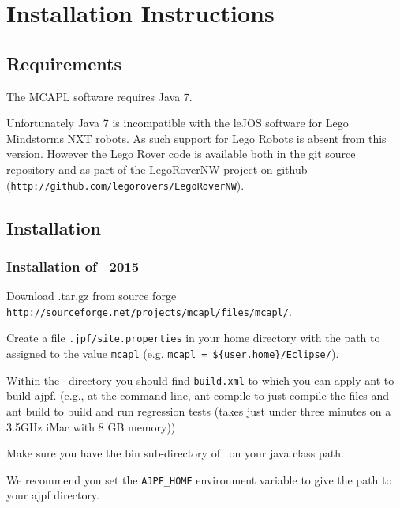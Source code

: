 \chapter{Installation Instructions}
\label{chap:installation}
\section{Requirements}

The MCAPL software requires Java 7.  

\begin{sloppypar}
Unfortunately Java 7 is incompatible with the leJOS software for Lego Mindstorms NXT robots.  As such support for Lego Robots is absent from this version.  However the Lego Rover code is available both in the git source repository and as part of the LegoRoverNW project on github (\texttt{http://github.com/legorovers/LegoRoverNW}).
\end{sloppypar}

\section{Installation}

\subsection{Installation of \ajpf\ 2015}

\begin{itemize}
\begin{sloppypar}
\item Download \ajpfversion.tar.gz from source forge \texttt{http://sourceforge.net/projects/mcapl/files/mcapl/}.
\end{sloppypar}
\item Create a file \texttt{.jpf/site.properties} in your home directory with the path to \ajpfversion assigned to the value \texttt{mcapl} (e.g. \texttt{mcapl = \$\{user.home\}/Eclipse/\ajpfversion}).
\item Within the \ajpfversion\ directory you should find \texttt{build.xml} to which you can apply ant to build ajpf. (e.g., at the command line, ant compile to just compile the files and ant build to build and run regression tests (takes just under three minutes on a 3.5GHz iMac with 8 GB memory))
\item Make sure you have the bin sub-directory of \ajpfversion\ on your java class path.
\item We recommend you set the \texttt{AJPF\_HOME} environment variable to give the path to your ajpf directory.
\end{itemize}

